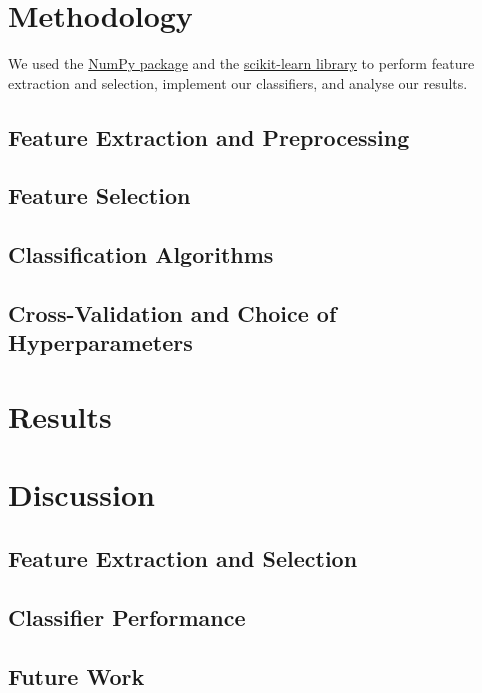 \documentclass[conference]{IEEEtran}
\begin{document}
\section{Methodology}

We used the \href{http://www.numpy.org/}{NumPy package} and the \href{http://www.scikit-learn.org/}{scikit-learn library} to perform feature extraction and selection, implement our classifiers, and analyse our results. 

\subsection{Feature Extraction and Preprocessing}


\subsection{Feature Selection}

\subsection{Classification Algorithms}

\subsection{Cross-Validation and Choice of Hyperparameters}

\section{Results}




\section{Discussion}

\subsection{Feature Extraction and Selection}



\subsection{Classifier Performance}

\subsection{Future Work}
\end{document}
